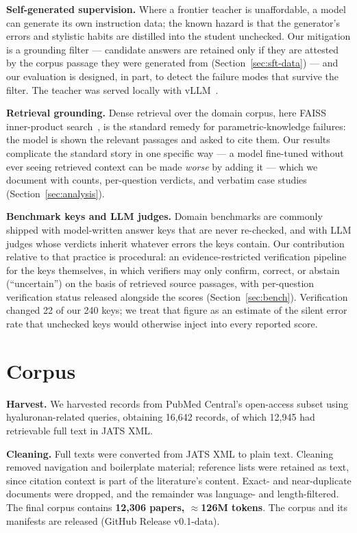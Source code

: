 \documentclass[11pt]{article}
\begin{document}
\textbf{Self-generated supervision.} Where a frontier teacher is
unaffordable, a model can generate its own instruction data; the known
hazard is that the generator's errors and stylistic habits are distilled
into the student unchecked. Our mitigation is a grounding filter ---
candidate answers are retained only if they are attested by the corpus
passage they were generated from (Section~\ref{sec:sft-data}) --- and our
evaluation is designed, in part, to detect the failure modes that survive
the filter. The teacher was served locally with vLLM~\cite{vllm}.

\textbf{Retrieval grounding.} Dense retrieval over the domain corpus,
here FAISS inner-product search~\cite{faiss}, is the standard remedy for
parametric-knowledge failures: the model is shown the relevant passages
and asked to cite them. Our results complicate the standard story in one
specific way --- a model fine-tuned without ever seeing retrieved context
can be made \emph{worse} by adding it --- which we document with counts,
per-question verdicts, and verbatim case studies
(Section~\ref{sec:analysis}).

\textbf{Benchmark keys and LLM judges.} Domain benchmarks are commonly
shipped with model-written answer keys that are never re-checked, and
with LLM judges whose verdicts inherit whatever errors the keys contain.
Our contribution relative to that practice is procedural: an
evidence-restricted verification pipeline for the keys themselves, in
which verifiers may only confirm, correct, or abstain
(``uncertain'') on the basis of retrieved source passages, with
per-question verification status released alongside the scores
(Section~\ref{sec:bench}). Verification changed 22 of our 240 keys; we
treat that figure as an estimate of the silent error rate that unchecked
keys would otherwise inject into every reported score.

\section{Corpus}
\label{sec:corpus}

\textbf{Harvest.} We harvested records from PubMed Central's open-access
subset using hyaluronan-related queries, obtaining 16,642 records, of
which 12,945 had retrievable full text in JATS XML.

\textbf{Cleaning.} Full texts were converted from JATS XML to plain text.
Cleaning removed navigation and boilerplate material; reference lists were
retained as text, since citation context is part of the literature's
content. Exact- and near-duplicate documents were dropped, and the
remainder was language- and length-filtered. The final corpus contains
\textbf{12,306 papers, $\approx$126M tokens}. The corpus and its manifests
are released (GitHub Release v0.1-data).
\end{document}
